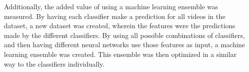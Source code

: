 \documentclass[../main.tex]{subfiles}
\begin{document}
Additionally, the added value of using a machine learning ensemble was measured. By having each
classifier make a prediction for all videos in the dataset, a new dataset was created, wherein the
features were the predictions made by the different classifiers. By using all possible combinations of
classifiers, and then having different neural networks use those features as input, a machine learning
ensemble was created. This ensemble was then optimized in a similar way to the classifiers individually.
\end{document}
